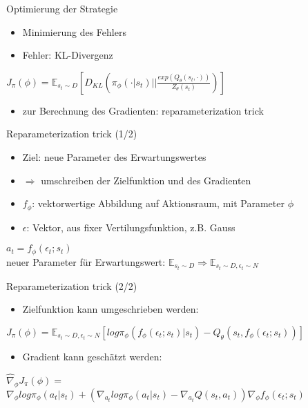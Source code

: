 \begin{frame}{Optimierung der Strategie}
\begin{itemize}
\item Minimierung des Fehlers
\item Fehler: KL-Divergenz
\end{itemize}
$J_{\pi}(\phi)=\mathbb{E}_{s_{t}\sim D}\left[D_{KL}\left(\pi_{\phi}(\cdot | s_{t})\bigg \vert\bigg \vert\frac{exp(Q_{\theta}(s_{t},\cdot))}{Z_{\theta}(s_{t})}\right)\right]$ \\[12pt]
\begin{itemize}
\item zur Berechnung des Gradienten: reparameterization trick
\end{itemize}
\end{frame}

\begin{frame}{Reparameterization trick (1/2)}
\begin{itemize}
\item Ziel: neue Parameter des Erwartungswertes
\item[] $\Rightarrow$ umschreiben der Zielfunktion und des Gradienten \\[12pt]
\item $f_{\phi}$: vektorwertige Abbildung auf Aktionsraum, mit Parameter $\phi$
\item $\epsilon$: Vektor, aus fixer Vertilungsfunktion, z.B. Gauss \\[12pt]
\end{itemize}
$a_{t}=f_{\phi}(\epsilon_{t};s_{t})$\\[6pt]
neuer Parameter für Erwartungswert: $\mathbb{E}_{s_{t}\sim D} \Rightarrow \mathbb{E}_{s_{t}\sim D,\epsilon_{t}\sim N}$
\end{frame}

\begin{frame}{Reparameterization trick (2/2)}
\begin{itemize}
\item Zielfunktion kann umgeschrieben werden:
\end{itemize}
$J_{\pi}(\phi)=\mathbb{E}_{s_{t}\sim D,\epsilon_{t}\sim N}\left[log\pi_{\phi}(f_{\phi}(\epsilon_{t};s_{t})|s_{t})-Q_{\theta}(s_{t},f_{\phi}(\epsilon_{t};s_{t}))\right]$ \\[12pt]

\begin{itemize}
\item Gradient kann geschätzt werden:
\end{itemize}
$\hat\nabla_{\phi}J_{\pi}(\phi) =$ \\[6pt]
$\nabla_{\phi} log \pi_{\phi}(a_{t}|s_{t}) + (\nabla_{a_{t}}log \pi_{\phi}(a_{t}|s_{t})-\nabla_{a_{t}}Q(s_{t},a_{t}))\nabla_{\phi}f_{\phi}(\epsilon_{t};s_{t})$
\end{frame}

